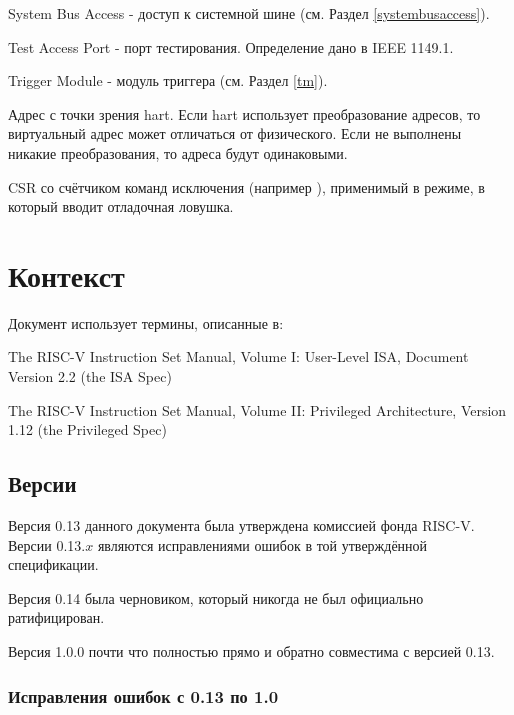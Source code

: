 \begin{description}[style=nextline]
    \item[SBA]
        System Bus Access - доступ к системной шине (см. Раздел \ref{systembusaccess}).
    \item[TAP]
        Test Access Port - порт тестирования. Определение дано в IEEE 1149.1.
    \item[TM]
        Trigger Module - модуль триггера (см. Раздел \ref{tm}).
    \item[виртуальный адрес]
        Адрес с точки зрения hart. Если hart использует преобразование адресов, то
        виртуальный адрес может отличаться от физического. Если не выполнены никакие преобразования,
        то адреса будут одинаковыми.
    \item[\Rxepc]
        CSR со счётчиком команд исключения (например \Rmepc), применимый в
        режиме, в который вводит отладочная ловушка.
\end{description}

\section{Контекст}

\begin{steps}{Документ использует термины, описанные в:}
\item The RISC-V Instruction Set Manual, Volume I: User-Level ISA, Document
    Version 2.2 (the ISA Spec)
\item The RISC-V Instruction Set Manual, Volume II: Privileged Architecture,
    Version 1.12 (the Privileged Spec)
\end{steps}

\subsection{Версии}

Версия 0.13 данного документа была утверждена комиссией фонда RISC-V.
Версии 0.13.$x$ являются исправлениями ошибок в той утверждённой спецификации.

Версия 0.14 была черновиком, который никогда не был официально ратифицирован.

Версия 1.0.0 почти что полностью прямо и обратно совместима с версией 0.13.

\newcommand{\PR}[1]{\href{https://github.com/riscv/riscv-debug-spec/pull/#1}{\##1}}

\subsubsection{Исправления ошибок с 0.13 по 1.0}

